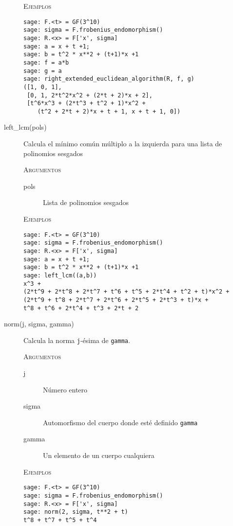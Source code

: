 \begin{description}
    \textsc{Ejemplos}
    \begin{lstlisting}
sage: F.<t> = GF(3^10)
sage: sigma = F.frobenius_endomorphism()
sage: R.<x> = F['x', sigma]
sage: a = x + t +1;
sage: b = t^2 * x**2 + (t+1)*x +1
sage: f = a*b
sage: g = a
sage: right_extended_euclidean_algorithm(R, f, g)
([1, 0, 1],
 [0, 1, 2*t^2*x^2 + (2*t + 2)*x + 2],
 [t^6*x^3 + (2*t^3 + t^2 + 1)*x^2 +
    (t^2 + 2*t + 2)*x + t + 1, x + t + 1, 0])
    \end{lstlisting}

    \item[left\_lcm(pols)]
    Calcula el mínimo común múltiplo a la izquierda para una lista de polinomios sesgados

    \textsc{Argumentos}
    \begin{description}
        \item[pols] Lista de polinomios sesgados
    \end{description}

    \textsc{Ejemplos}
    \begin{lstlisting}
sage: F.<t> = GF(3^10)
sage: sigma = F.frobenius_endomorphism()
sage: R.<x> = F['x', sigma]
sage: a = x + t +1;
sage: b = t^2 * x**2 + (t+1)*x +1
sage: left_lcm((a,b))
x^3 +
(2*t^9 + 2*t^8 + 2*t^7 + t^6 + t^5 + 2*t^4 + t^2 + t)*x^2 +
(2*t^9 + t^8 + 2*t^7 + 2*t^6 + 2*t^5 + 2*t^3 + t)*x +
t^8 + t^6 + 2*t^4 + t^3 + 2*t + 2
    \end{lstlisting}

    \item[norm(j, sigma, gamma)]
    Calcula la norma \texttt{j}-ésima de \texttt{gamma}.

    \textsc{Argumentos}
    \begin{description}
        \item[j] Número entero
        \item[sigma] Automorfismo del cuerpo donde esté definido \texttt{gamma}
        \item[gamma] Un elemento de un cuerpo cualquiera
    \end{description}

    \textsc{Ejemplos}
    \begin{lstlisting}
sage: F.<t> = GF(3^10)
sage: sigma = F.frobenius_endomorphism()
sage: R.<x> = F['x', sigma]
sage: norm(2, sigma, t**2 + t)
t^8 + t^7 + t^5 + t^4
    \end{lstlisting}

\end{description}
